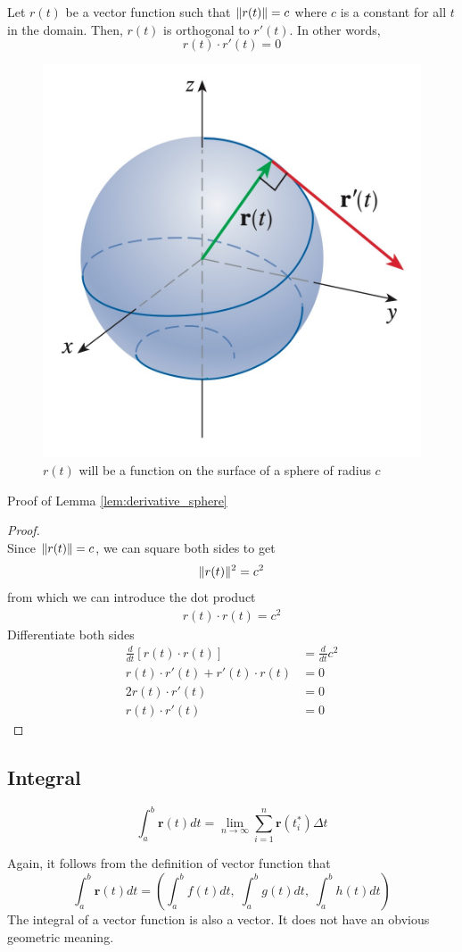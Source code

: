 \begin{lemma} \label{lem:derivative_sphere}
Let $r(t)$ be a vector function such that $\lVert r(t) \rVert=c$ where $c$ is a constant for all $t$ in the domain. Then, $r(t)$ is orthogonal to $r'(t)$. In other words,
$$
r(t) \cdot r'(t) = 0
$$
\begin{figure}[h]
    \centering
    \includegraphics[width=0.3\linewidth]{figures/sphere.jpeg}
    \caption{$r(t)$ will be a function on the surface of a sphere of radius $c$}
    \label{fig:derivative_sphere}
\end{figure}
\end{lemma}

Proof of Lemma \ref{lem:derivative_sphere}

\begin{proof}
\hfill \\
Since $\lVert r(t) \rVert = c$, we can square both sides to get
$$
\lVert r(t) \rVert^2 = c^2
$$
from which we can introduce the dot product
\begin{align*}
    r(t) \cdot r(t) = c^2
\end{align*}
Differentiate both sides
\begin{align*}
    \frac{d}{dt} [r(t) \cdot r(t)] &= \frac{d}{dt} c^2 \\
    r(t) \cdot r'(t) + r'(t) \cdot r(t) &= 0 \\
    2r(t)\cdot r'(t) &= 0 \\
    r(t) \cdot r'(t) &= 0
\end{align*}
\end{proof}

\subsection{Integral}

\begin{definition}
$$
\int_a^b \mathbf{r}(t)dt = \lim_{n\to\infty}\sum_{i=1}^n \mathbf{r}(t_i^*)\Delta t
$$
\end{definition}
Again, it follows from the definition of vector function that
$$
\int_a^b \mathbf{r}(t)dt = \left(\int_a^b f(t)dt,\; \int_a^b g(t)dt,\; \int_a^b h(t)dt \right)
$$
The integral of a vector function is also a vector. It does not have an obvious geometric meaning.

